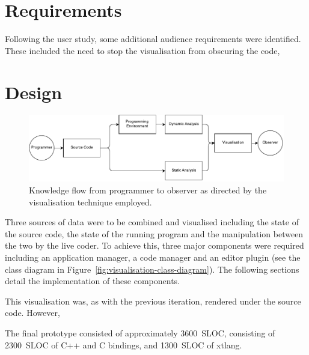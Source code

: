 
\section{Requirements}

Following the user study, some additional audience requirements were identified. These included the need to stop the visualisation from obscuring the code, 

\more

\section{Design}





\begin{figure}
  \centering \includegraphics[width=\columnwidth]{../images/diagrams/knowledge-flow-refined.pdf}
  \caption{Knowledge flow from programmer to observer as directed by the visualisation technique employed.}
\label{fig:knowledge-flow-refined}
\end{figure}

Three sources of data were to be combined and visualised including the state of the source code, the state of the running program and the manipulation between the two by the live coder. To achieve this, three major components were required including an application manager, a code manager and an editor plugin (see the class diagram in Figure~\ref{fig:visualisation-class-diagram}). The following sections detail the implementation of these components.

This visualisation was, as with the previous iteration, rendered under the source code. However, \more

The final prototype consisted of approximately 3600~\ac{SLOC}, consisting of 2300~\ac{SLOC} of C++ and C bindings, and 1300~\ac{SLOC} of xtlang.

